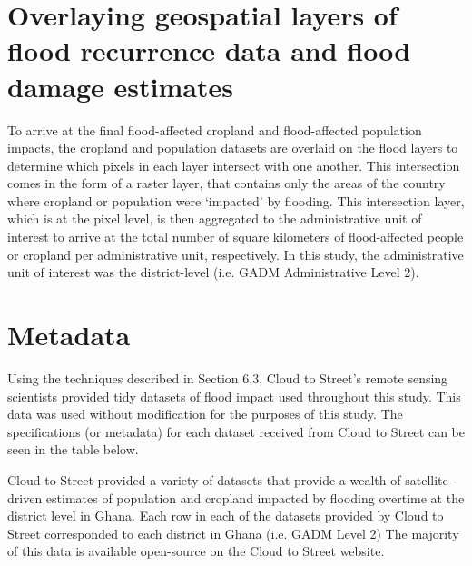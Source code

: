 \section{Overlaying geospatial layers of flood recurrence data and flood damage estimates}

To arrive at the final flood-affected cropland and flood-affected population impacts, the cropland and population datasets are overlaid on the flood layers to determine which pixels in each layer intersect with one another. This intersection comes in the form of a raster layer, that contains only the areas of the country where cropland or population were ‘impacted’ by flooding. This intersection layer, which is at the pixel level, is then aggregated to the administrative unit of interest to arrive at the total number of square kilometers of flood-affected people or cropland per administrative unit, respectively. In this study, the administrative unit of interest was the district-level (i.e. GADM Administrative Level 2).

\section{Metadata}

Using the techniques described in Section 6.3, Cloud to Street’s remote sensing scientists provided tidy datasets of flood impact used throughout this study. This data was used without modification for the purposes of this study. The specifications (or metadata) for each dataset received from Cloud to Street can be seen in the table below.

Cloud to Street provided a variety of datasets that provide a wealth of satellite-driven estimates of population and cropland impacted by flooding overtime at the district level in Ghana. Each row in each of the datasets provided by Cloud to Street corresponded to each district in Ghana (i.e. GADM Level 2) The majority of this data is available open-source on the Cloud to Street website.

